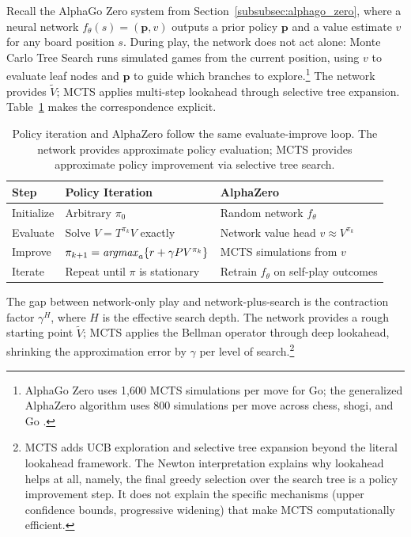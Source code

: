 Recall the AlphaGo Zero system from Section~\ref{subsubsec:alphago_zero}, where a neural network $f_\theta(s) = (\mathbf{p}, v)$ outputs a prior policy $\mathbf{p}$ and a value estimate $v$ for any board position $s$. During play, the network does not act alone: Monte Carlo Tree Search runs simulated games from the current position, using $v$ to evaluate leaf nodes and $\mathbf{p}$ to guide which branches to explore.\footnote{AlphaGo Zero uses 1,600 MCTS simulations per move for Go; the generalized AlphaZero algorithm uses 800 simulations per move across chess, shogi, and Go \citep[Table~S3]{Silver2018}.} The network provides $\tilde{V}$; MCTS applies multi-step lookahead through selective tree expansion. Table~\ref{tab:pi_alphazero} makes the correspondence explicit.

\begin{table}[h]
\centering
\small
\begin{tabular}{lll}
\hline
Step & Policy Iteration & AlphaZero \\
\hline
Initialize & Arbitrary $\pi_0$ & Random network $f_\theta$ \\
Evaluate & Solve $V = T^{\pi_k} V$ exactly & Network value head $v \approx V^{\pi_k}$ \\
Improve & $\pi_{k+1} = \mathop{\it argmax}_a \{r + \gamma P V^{\pi_k}\}$ & MCTS simulations from $v$ \\
Iterate & Repeat until $\pi$ is stationary & Retrain $f_\theta$ on self-play outcomes \\
\hline
\end{tabular}
\caption{Policy iteration and AlphaZero follow the same evaluate-improve loop. The network provides approximate policy evaluation; MCTS provides approximate policy improvement via selective tree search.}
\label{tab:pi_alphazero}
\end{table}

The gap between network-only play and network-plus-search is the contraction factor $\gamma^H$, where $H$ is the effective search depth. The network provides a rough starting point $\tilde{V}$; MCTS applies the Bellman operator through deep lookahead, shrinking the approximation error by $\gamma$ per level of search.\footnote{MCTS adds UCB exploration and selective tree expansion beyond the literal lookahead framework. The Newton interpretation explains why lookahead helps at all, namely, the final greedy selection over the search tree is a policy improvement step. It does not explain the specific mechanisms (upper confidence bounds, progressive widening) that make MCTS computationally efficient.}

